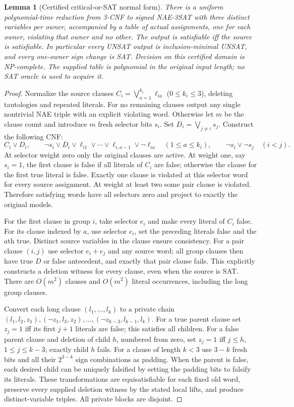 \documentclass[11pt]{article}
\newtheorem{lemma}[theorem]{Lemma}
\begin{document}
\begin{lemma}[Certified critical-or-SAT normal form]\label{lem:do16-critical}
There is a uniform polynomial-time reduction from 3-CNF to signed NAE-3SAT with three distinct variables per owner, accompanied by a table of actual assignments, one for each owner, violating that owner and no other. The output is satisfiable iff the source is satisfiable. In particular every UNSAT output is inclusion-minimal UNSAT, and every one-owner sign change is SAT. Decision on this certified domain is NP-complete. The supplied table is polynomial in the original input length; no SAT oracle is used to acquire it.
\end{lemma}
\begin{proof}
Normalize the source clauses $C_i=\bigvee_{a=1}^{k_i}\ell_{ia}$ ($0\le k_i\le3$), deleting tautologies and repeated literals. For no remaining clauses output any single nontrivial NAE triple with an explicit violating word. Otherwise let $m$ be the clause count and introduce $m$ fresh selector bits $s_i$. Set $D_i=\bigvee_{j\ne i}s_j$. Construct the following CNF:
\[
 C_i\vee D_i,\qquad
 \neg s_i\vee D_i\vee\ell_{i1}\vee\cdots\vee
 \ell_{i,a-1}\vee\neg\ell_{ia}\quad(1\le a\le k_i),\qquad
 \neg s_i\vee\neg s_j\quad(i<j).
\]
At selector weight zero only the original clauses are active. At weight one, say $s_i=1$, the first clause is false if all literals of $C_i$ are false; otherwise the clause for the first true literal is false. Exactly one clause is violated at this selector word for every source assignment. At weight at least two some pair clause is violated. Therefore satisfying words have all selectors zero and project to exactly the original models.

For the first clause in group $i$, take selector $e_i$ and make every literal of $C_i$ false. For its clause indexed by $a$, use selector $e_i$, set the preceding literals false and the $a$th true. Distinct source variables in the clause ensure consistency. For a pair clause $(i,j)$ use selector $e_i+e_j$ and any source word; all group clauses then have true $D$ or false antecedent, and exactly that pair clause fails. This explicitly constructs a deletion witness for every clause, even when the source is SAT. There are $O(m^2)$ clauses and $O(m^2)$ literal occurrences, including the long group clauses.

Convert each long clause $(l_1,\dots,l_k)$ to a private chain $(l_1,l_2,z_1),(\neg z_1,l_3,z_2),\dots,(\neg z_{k-3},l_{k-1},l_k)$. For a true parent clause set $z_j=1$ iff its first $j+1$ literals are false; this satisfies all children. For a false parent clause and deletion of child $h$, numbered from zero, set $z_j=1$ iff $j\le h$, $1\le j\le k-3$; exactly child $h$ fails. For a clause of length $k<3$ use $3-k$ fresh bits and all their $2^{3-k}$ sign combinations as padding. When the parent is false, each desired child can be uniquely falsified by setting the padding bits to falsify its literals. These transformations are equisatisfiable for each fixed old word, preserve every supplied deletion witness by the stated local lifts, and produce distinct-variable triples. All private blocks are disjoint.


\end{proof}
\end{document}
